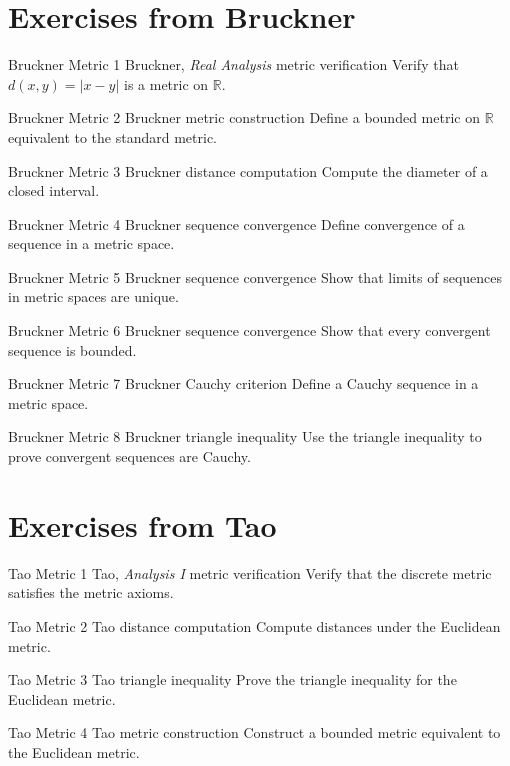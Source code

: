 
\section*{Exercises from Bruckner}

\exstub
{Bruckner Metric 1}
{Bruckner, \textit{Real Analysis}}
{metric verification}
{Verify that $d(x,y)=|x-y|$ is a metric on $\mathbb R$.}

\exstub
{Bruckner Metric 2}
{Bruckner}
{metric construction}
{Define a bounded metric on $\mathbb R$ equivalent to the standard metric.}

\exstub
{Bruckner Metric 3}
{Bruckner}
{distance computation}
{Compute the diameter of a closed interval.}

\exstub
{Bruckner Metric 4}
{Bruckner}
{sequence convergence}
{Define convergence of a sequence in a metric space.}

\exstub
{Bruckner Metric 5}
{Bruckner}
{sequence convergence}
{Show that limits of sequences in metric spaces are unique.}

\exstub
{Bruckner Metric 6}
{Bruckner}
{sequence convergence}
{Show that every convergent sequence is bounded.}

\exstub
{Bruckner Metric 7}
{Bruckner}
{Cauchy criterion}
{Define a Cauchy sequence in a metric space.}

\exstub
{Bruckner Metric 8}
{Bruckner}
{triangle inequality}
{Use the triangle inequality to prove convergent sequences are Cauchy.}


\section*{Exercises from Tao}

\exstub
{Tao Metric 1}
{Tao, \textit{Analysis I}}
{metric verification}
{Verify that the discrete metric satisfies the metric axioms.}

\exstub
{Tao Metric 2}
{Tao}
{distance computation}
{Compute distances under the Euclidean metric.}

\exstub
{Tao Metric 3}
{Tao}
{triangle inequality}
{Prove the triangle inequality for the Euclidean metric.}

\exstub
{Tao Metric 4}
{Tao}
{metric construction}
{Construct a bounded metric equivalent to the Euclidean metric.}

